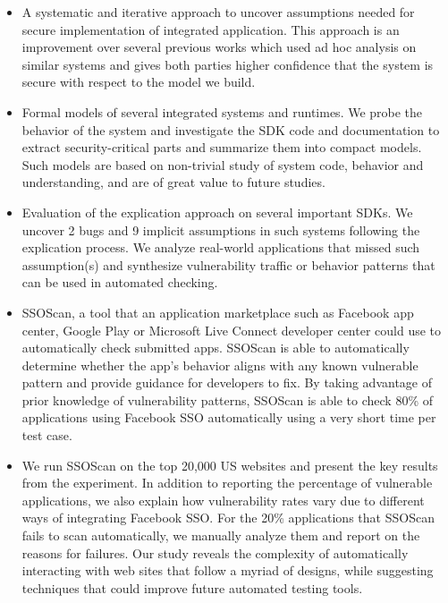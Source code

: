 \begin{itemize}

\item A systematic and iterative approach to uncover assumptions needed for secure implementation of integrated application.  This approach is an improvement over several previous works which used ad hoc analysis on similar systems and gives both parties higher confidence that the system is secure with respect to the model we build.  

\item Formal models of several integrated systems and runtimes.  We probe the behavior of the system and investigate the SDK code and documentation to extract security-critical parts and summarize them into compact models.  Such models are based on non-trivial study of system code, behavior and understanding, and are of great value to future studies.

\item Evaluation of the explication approach on several important SDKs.  We uncover 2 bugs and 9 implicit assumptions in such systems following the explication process.  We analyze real-world applications that missed such assumption(s) and synthesize vulnerability traffic or behavior patterns that can be used in automated checking.

\item SSOScan, a tool that an application marketplace such as Facebook app center, Google Play or Microsoft Live Connect developer center could use to automatically check submitted apps.  SSOScan is able to automatically determine whether the app's behavior aligns with any known vulnerable pattern and provide guidance for developers to fix.  By taking advantage of prior knowledge of vulnerability patterns, SSOScan is able to check 80\% of applications using Facebook SSO automatically using a very short time per test case.

\item We run SSOScan on the top 20,000 US websites and present the key results from the experiment.  In addition to reporting the percentage of vulnerable applications, we also explain how vulnerability rates vary due to different ways of integrating Facebook SSO.  For the 20\% applications that SSOScan fails to scan automatically, we manually analyze them and report on the reasons for failures.  Our study reveals the complexity of automatically interacting with web sites that follow a myriad of designs, while suggesting techniques that could improve future automated testing tools. 

\end{itemize}

